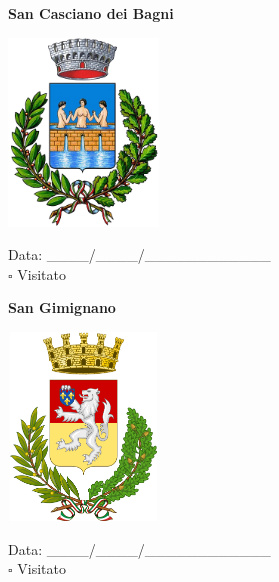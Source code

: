 \documentclass[a5paper,12pt]{article}
\begin{document}
\newpage

\noindent
\begin{minipage}[t]{0.45\textwidth}
    \begin{center}
        \textbf{San Casciano dei Bagni}
    \end{center}
    \vspace{-0.5cm} %
    \begin{center}
        \includegraphics[height= 5cm, width=4cm]{Toscana/Stemma San Casciano dei Bagni.png}
    \end{center}
    \vspace{-0.4cm} %
    \begin{flushleft}
        Data: \_\_\_\_/\_\_\_\_/\_\_\_\_\_\_\_\_\_\_\_\_ \\
        $\square$ Visitato
    \end{flushleft}
\end{minipage}
\hfill
\noindent
\begin{minipage}[t]{0.45\textwidth}
    \begin{center}
        \textbf{San Gimignano}
    \end{center}
    \vspace{-0.5cm} %
    \begin{center}
        \includegraphics[height= 5cm, width=4cm]{Toscana/Stemma San Gimignano.png}
    \end{center}
    \vspace{-0.4cm} %
    \begin{flushleft}
        Data: \_\_\_\_/\_\_\_\_/\_\_\_\_\_\_\_\_\_\_\_\_ \\
        $\square$ Visitato
    \end{flushleft}
\end{minipage}
\end{document}
